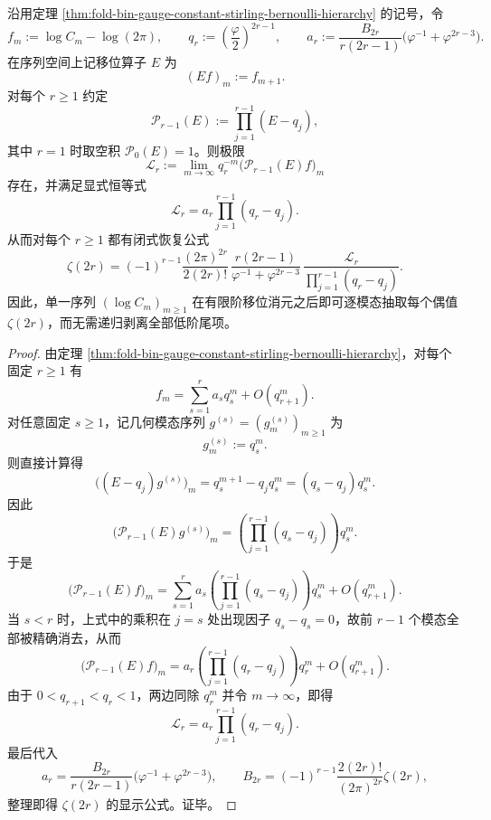 \begin{theorem}\label{thm:derived-fold-gauge-shift-annihilator-even-zeta}
沿用定理 \ref{thm:fold-bin-gauge-constant-stirling-bernoulli-hierarchy} 的记号，令
\[
f_m:=\log C_m-\log(2\pi),
\qquad
q_r:=\left(\frac{\varphi}{2}\right)^{2r-1},
\qquad
a_r:=\frac{B_{2r}}{r(2r-1)}\bigl(\varphi^{-1}+\varphi^{2r-3}\bigr).
\]
在序列空间上记移位算子 \(E\) 为
\[
(Ef)_m:=f_{m+1}.
\]
对每个 \(r\ge 1\) 约定
\[
\mathcal P_{r-1}(E):=\prod_{j=1}^{r-1}(E-q_j),
\]
其中 \(r=1\) 时取空积 \(\mathcal P_0(E)=1\)。则极限
\[
\mathcal L_r
:=
\lim_{m\to\infty}q_r^{-m}\bigl(\mathcal P_{r-1}(E)f\bigr)_m
\]
存在，并满足显式恒等式
\[
\mathcal L_r
=
a_r\prod_{j=1}^{r-1}(q_r-q_j).
\]
从而对每个 \(r\ge 1\) 都有闭式恢复公式
\[
\zeta(2r)
=
(-1)^{r-1}\frac{(2\pi)^{2r}}{2(2r)!}\,
\frac{r(2r-1)}{\varphi^{-1}+\varphi^{2r-3}}\,
\frac{\mathcal L_r}{\prod_{j=1}^{r-1}(q_r-q_j)}.
\]
因此，单一序列 \((\log C_m)_{m\ge 1}\) 在有限阶移位消元之后即可逐模态抽取每个偶值 \(\zeta(2r)\)，而无需递归剥离全部低阶尾项。
\end{theorem}
\begin{proof}
由定理 \ref{thm:fold-bin-gauge-constant-stirling-bernoulli-hierarchy}，对每个固定 \(r\ge 1\) 有
\[
f_m=\sum_{s=1}^{r}a_s q_s^m+O(q_{r+1}^m).
\]
对任意固定 \(s\ge 1\)，记几何模态序列 \(g^{(s)}=(g_m^{(s)})_{m\ge 1}\) 为
\[
g_m^{(s)}:=q_s^m.
\]
则直接计算得
\[
\bigl((E-q_j)g^{(s)}\bigr)_m
=q_s^{m+1}-q_j q_s^m
=(q_s-q_j)q_s^m.
\]
因此
\[
\bigl(\mathcal P_{r-1}(E)g^{(s)}\bigr)_m
=
\left(\prod_{j=1}^{r-1}(q_s-q_j)\right)q_s^m.
\]
于是
\[
\bigl(\mathcal P_{r-1}(E)f\bigr)_m
=
\sum_{s=1}^{r}a_s\left(\prod_{j=1}^{r-1}(q_s-q_j)\right)q_s^m
+O(q_{r+1}^m).
\]
当 \(s<r\) 时，上式中的乘积在 \(j=s\) 处出现因子 \(q_s-q_s=0\)，故前 \(r-1\) 个模态全部被精确消去，从而
\[
\bigl(\mathcal P_{r-1}(E)f\bigr)_m
=
a_r\left(\prod_{j=1}^{r-1}(q_r-q_j)\right)q_r^m
+O(q_{r+1}^m).
\]
由于 \(0<q_{r+1}<q_r<1\)，两边同除 \(q_r^m\) 并令 \(m\to\infty\)，即得
\[
\mathcal L_r
=
a_r\prod_{j=1}^{r-1}(q_r-q_j).
\]
最后代入
\[
a_r=\frac{B_{2r}}{r(2r-1)}\bigl(\varphi^{-1}+\varphi^{2r-3}\bigr),
\qquad
B_{2r}=(-1)^{r-1}\frac{2(2r)!}{(2\pi)^{2r}}\zeta(2r),
\]
整理即得 \(\zeta(2r)\) 的显示公式。证毕。
\end{proof}

